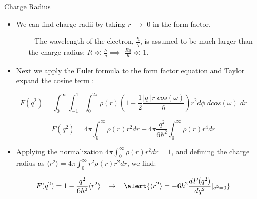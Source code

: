 \documentclass[10pt]{beamer}
\begin{document}
\begin{frame}[fragile]{Charge Radius}
	\begin{itemize}
		\item We can find \alert{charge radii} by taking \alert{$r$ $\rightarrow$ 0} in the form factor. 
		\begin{itemize}
			\item[--] The wavelength of the electron, $\frac{\hbar}{q}$, is assumed to be much larger than the charge radius: $R \ll \frac{\hbar}{q} \implies$ \alert{$\frac{Rq}{\hbar} \ll 1$}.
		\end{itemize}
		\pause
		\item Next we apply the Euler formula to the form factor equation and Taylor expand the cosine term \cite{Book:Povh}:
	\end{itemize}
	
	\vspace{-2mm}
	\begin{equation} \label{eq:ff_expanded}
		F(q^2) = \int_0^\infty \int_{-1}^1 \int_0^{2\pi} \rho(r) \left( 1-\frac{1}{2} \frac{|q||r|cos(\omega)}{\hbar} \right) r^2 d\phi \; dcos(\omega) \; dr
	\end{equation}
	
	\pause
	\begin{equation} \label{eq:ff_expanded_r}
		F(q^2) = 4\pi \int_0^\infty \rho(r) r^2 dr - 4\pi \frac{q^2}{6\hbar^2} \int_0^\infty \rho(r) r^4 dr
	\end{equation}
	
	\pause
	\begin{itemize}
		\item Applying the normalization $4\pi \int_0^\infty \rho(r) r^2 dr = 1$, and defining the charge radius as $\langle r^2 \rangle = 4\pi \int_0^\infty r^2 \rho(r) r^2 dr$, we find:
	\end{itemize}
	
	\pause
	\begin{equation} \label{eq:ff_rms}
		F(q^2) = 1 - \frac{q^2}{6\hbar^2} \langle r^2 \rangle \;\;\; \rightarrow \;\;\; \alert{\langle r^2 \rangle = -6\hbar^2 \frac{dF(q^2)}{dq^2} |_{q^2=0}}
	\end{equation}
	
\end{frame}
\end{document}
